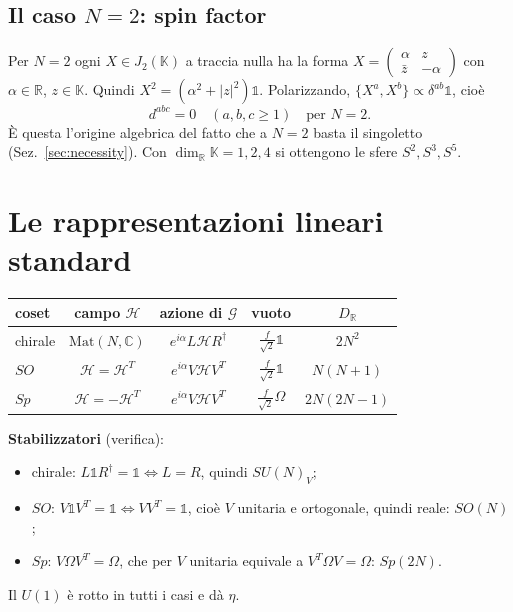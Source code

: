 \documentclass[11pt,a4paper]{article}
\numberwithin{equation}{section}
\theoremstyle{remark}
\newcommand{\Hf}{\mathcal{H}}
\newcommand{\G}{\mathcal{G}}
\newcommand{\one}{\mathbb{1}}
\newcommand{\R}{\mathbb{R}}
\newcommand{\C}{\mathbb{C}}
\begin{document}
\subsection{Il caso $N=2$: spin factor}

Per $N=2$ ogni $X\in J_2(\mathbb K)$ a traccia nulla ha la forma $X=\begin{pmatrix}\alpha&z\\\bar z&-\alpha\end{pmatrix}$ con $\alpha\in\R$, $z\in\mathbb K$. Quindi $X^2=(\alpha^2+|z|^2)\one$. Polarizzando, $\{X^a,X^b\}\propto\delta^{ab}\one$, cioè
\[
\boxed{d^{abc}=0\quad(a,b,c\ge1)\quad\text{per }N=2.}
\]
È questa l'origine algebrica del fatto che a $N=2$ basta il singoletto (Sez.~\ref{sec:necessity}). Con $\dim_\R\mathbb K=1,2,4$ si ottengono le sfere $S^2,S^3,S^5$.

\section{Le rappresentazioni lineari standard}
\label{sec:reps}

\begin{center}
\begin{tabular}{lcccc}
\hline
coset & campo $\Hf$ & azione di $\G$ & vuoto & $D_\R$ \\
\hline
chirale & $\mathrm{Mat}(N,\C)$ & $e^{i\alpha}L\Hf R^\dagger$ & $\frac{f}{\sqrt2}\one$ & $2N^2$\\
$SO$ & $\Hf=\Hf^T$ & $e^{i\alpha}V\Hf V^T$ & $\frac{f}{\sqrt2}\one$ & $N(N+1)$\\
$Sp$ & $\Hf=-\Hf^T$ & $e^{i\alpha}V\Hf V^T$ & $\frac{f}{\sqrt2}\Omega$ & $2N(2N-1)$\\
\hline
\end{tabular}
\end{center}

\textbf{Stabilizzatori} (verifica):
\begin{itemize}[nosep]
\item chirale: $L\one R^\dagger=\one\iff L=R$, quindi $SU(N)_V$;
\item $SO$: $V\one V^T=\one\iff VV^T=\one$, cioè $V$ unitaria e ortogonale, quindi reale: $SO(N)$;
\item $Sp$: $V\Omega V^T=\Omega$, che per $V$ unitaria equivale a $V^T\Omega V=\Omega$: $Sp(2N)$.
\end{itemize}
Il $U(1)$ è rotto in tutti i casi e dà $\eta$.
\end{document}
